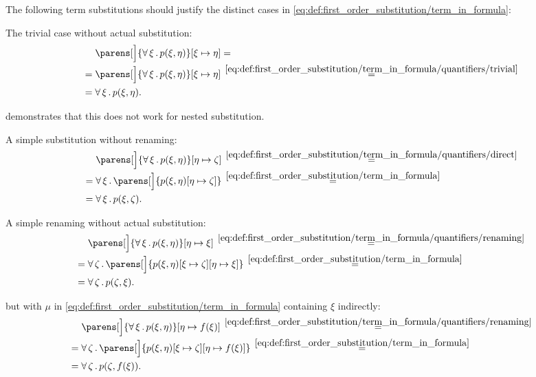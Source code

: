 \begin{example}\label{ex:first_order_substitution}
  The following term substitutions should justify the distinct cases in \eqref{eq:def:first_order_substitution/term_in_formula}:
  \begin{thmenum}
     The trivial case without actual substitution:
    \begin{align*}
      &\phantom{{}={}}
      \parens[\Big]{\qforall \xi p(\xi, \eta)}[\xi \mapsto \eta]
      = \\ &=
      \parens[\Big]{\qforall \xi p(\xi, \eta)}[\xi \mapsto \eta]
      \reloset {\eqref{eq:def:first_order_substitution/term_in_formula/quantifiers/trivial}} = \\ &=
      \qforall \xi p(\xi, \eta).
    \end{align*}

     demonstrates that this does not work for nested substitution.

     A simple substitution without renaming:
    \begin{align*}
      &\phantom{{}={}}
      \parens[\Big]{\qforall \xi p(\xi, \eta)}[\eta \mapsto \zeta]
      \reloset {\eqref{eq:def:first_order_substitution/term_in_formula/quantifiers/direct}} = \\ &=
      \qforall \xi \parens[\Big]{p(\xi, \eta)[\eta \mapsto \zeta]}
      \reloset {\eqref{eq:def:first_order_substitution/term_in_formula}} = \\ &=
      \qforall \xi p(\xi, \zeta).
    \end{align*}

     A simple renaming without actual substitution:
    \begin{align*}
      &\phantom{{}={}}
      \parens[\Big]{\qforall \xi p(\xi, \eta)}[\eta \mapsto \xi]
      \reloset {\eqref{eq:def:first_order_substitution/term_in_formula/quantifiers/renaming}} = \\ &=
      \qforall \zeta \parens[\Big]{p(\xi, \eta)[\xi \mapsto \zeta][\eta \mapsto \xi]}
      \reloset {\eqref{eq:def:first_order_substitution/term_in_formula}} = \\ &=
      \qforall \zeta p(\zeta, \xi).
    \end{align*}

      but with \( \mu \) in \eqref{eq:def:first_order_substitution/term_in_formula} containing \( \xi \) indirectly:
    \begin{align*}
      &\phantom{{}={}}
      \parens[\Big]{\qforall \xi p(\xi, \eta)}[\eta \mapsto f(\xi)]
      \reloset {\eqref{eq:def:first_order_substitution/term_in_formula/quantifiers/renaming}} = \\ &=
      \qforall \zeta \parens[\Big]{p(\xi, \eta)[\xi \mapsto \zeta][\eta \mapsto f(\xi)]}
      \reloset {\eqref{eq:def:first_order_substitution/term_in_formula}} = \\ &=
      \qforall \zeta p(\zeta, f(\xi)).
    \end{align*}


\end{thmenum}
\end{example}
